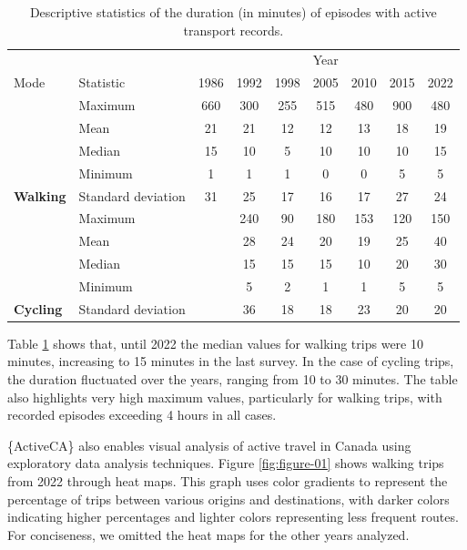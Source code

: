 \documentclass[Royal,times,sageh]{sagej}
\begin{document}
\begin{table}
\centering
\caption{\label{tab:table-01}\label{tab:table-01}Descriptive statistics of the duration (in minutes) of episodes with active transport records.}
\centering
\fontsize{8}{10}\selectfont
\begin{tabular}[t]{>{}llccccccc}
\toprule
\multicolumn{2}{c}{ } & \multicolumn{7}{c}{Year} \\
\cmidrule(l{3pt}r{3pt}){3-9}
Mode & Statistic & 1986 & 1992 & 1998 & 2005 & 2010 & 2015 & 2022\\
\midrule
 & Maximum & 660 & 300 & 255 & 515 & 480 & 900 & 480\\

 & Mean & 21 & 21 & 12 & 12 & 13 & 18 & 19\\

 & Median & 15 & 10 & 5 & 10 & 10 & 10 & 15\\

 & Minimum & 1 & 1 & 1 & 0 & 0 & 5 & 5\\

\multirow[t]{-5}{*}{\raggedright\arraybackslash \textbf{Walking}} & Standard deviation & 31 & 25 & 17 & 16 & 17 & 27 & 24\\
\cmidrule{1-9}
 & Maximum &  & 240 & 90 & 180 & 153 & 120 & 150\\

 & Mean &  & 28 & 24 & 20 & 19 & 25 & 40\\

 & Median &  & 15 & 15 & 15 & 10 & 20 & 30\\

 & Minimum &  & 5 & 2 & 1 & 1 & 5 & 5\\

\multirow[t]{-5}{*}{\raggedright\arraybackslash \textbf{Cycling}} & Standard deviation &  & 36 & 18 & 18 & 23 & 20 & 20\\
\bottomrule
\end{tabular}
\end{table}

Table \ref{tab:table-01} shows that, until 2022 the median values for
walking trips were 10 minutes, increasing to 15 minutes in the last
survey. In the case of cycling trips, the duration fluctuated over the
years, ranging from 10 to 30 minutes. The table also highlights very
high maximum values, particularly for walking trips, with recorded
episodes exceeding 4 hours in all cases.

\{ActiveCA\} also enables visual analysis of active travel in Canada
using exploratory data analysis techniques. Figure \ref{fig:figure-01}
shows walking trips from 2022 through heat maps. This graph uses color
gradients to represent the percentage of trips between various origins
and destinations, with darker colors indicating higher percentages and
lighter colors representing less frequent routes. For conciseness, we
omitted the heat maps for the other years analyzed.
\end{document}
